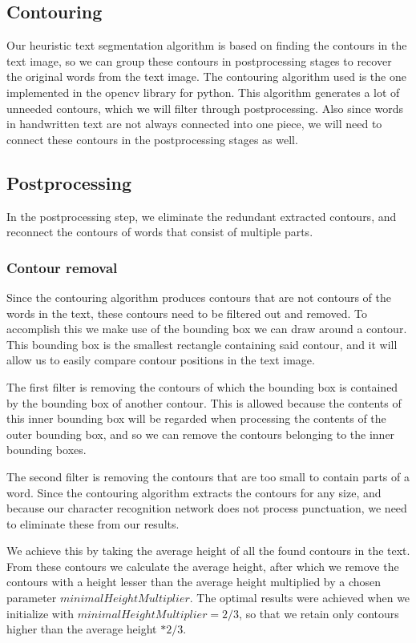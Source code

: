 \documentclass{article}
\begin{document}
\subsection{Contouring}
Our heuristic text segmentation algorithm is based on finding the contours in the text image, so we can group these contours in postprocessing stages to recover the original words from the text image.
The contouring algorithm used is the one implemented in the opencv library for python.
This algorithm generates a lot of unneeded contours, which we will filter through postprocessing.
Also since words in handwritten text are not always connected into one piece, we will need to connect these contours in the postprocessing stages as well.

\subsection{Postprocessing}
In the postprocessing step, we eliminate the redundant extracted contours, and reconnect the contours of words that consist of multiple parts.

\subsubsection{Contour removal}
Since the contouring algorithm produces contours that are not contours of the words in the text, these contours need to be filtered out and removed.
To accomplish this we make use of the bounding box we can draw around a contour.
This bounding box is the smallest rectangle containing said contour, and it will allow us to easily compare contour positions in the text image.

The first filter is removing the contours of which the bounding box is contained by the bounding box of another contour.
This is allowed because the contents of this inner bounding box will be regarded when processing the contents of the outer bounding box, and so we can remove the contours belonging to the inner bounding boxes.

The second filter is removing the contours that are too small to contain parts of a word.
Since the contouring algorithm extracts the contours for any size, and because our character recognition network does not process punctuation,
we need to eliminate these from our results.

We achieve this by taking the average height of all the found contours in the text.
From these contours we calculate the average height, after which we remove the contours with a height lesser than the average height multiplied by a chosen parameter $minimalHeightMultiplier$.
The optimal results were achieved when we initialize with $minimalHeightMultiplier = 2/3$, so that we retain only contours higher than the average height $ * 2/3$.
\end{document}

